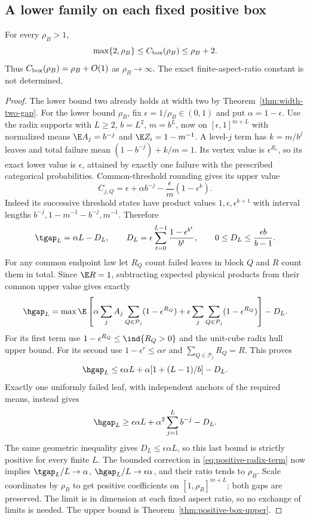 \subsection{A lower family on each fixed positive box}
\begin{theorem}\label{thm:positive-box-lower}
For every $\rho_B>1$,
\[
 \max\{2,\rho_B\}\le C_{\rm box}(\rho_B)\le\rho_B+2.
\]
Thus $C_{\rm box}(\rho_B)=\rho_B+O(1)$ as $\rho_B\to\infty$.
The exact finite-aspect-ratio constant is not determined.
\end{theorem}
\begin{proof}
The lower bound two already holds at width two by
Theorem~\ref{thm:width-two-gap}. For the lower bound $\rho_B$, fix
$\epsilon=1/\rho_B\in(0,1)$ and put $\alpha=1-\epsilon$.
Use the radix supports with $L\ge2$, $b=L^2$, $m=b^L$, now on
$[\epsilon,1]^{m+L}$ with normalized means
$\E A_j=b^{-j}$ and $\E Z_i=1-m^{-1}$. A level-$j$ term has
$k=m/b^j$ leaves and total failure mean $(1-b^{-j})+k/m=1$.
Its vertex value is $\epsilon^{R_e}$, so its exact lower value is
$\epsilon$, attained by exactly one failure with the prescribed
categorical probabilities. Common-threshold rounding gives its upper
value
\[
 C_{j,Q}=\epsilon+\alpha b^{-j}
                      -\frac\epsilon m(1-\epsilon^k).
\]
Indeed its successive threshold states have product values
$1,\epsilon,\epsilon^{k+1}$ with interval lengths
$b^{-j},1-m^{-1}-b^{-j},m^{-1}$. Therefore
\begin{equation}\label{eq:positive-radix-term}
 \tgap_L=\alpha L-D_L,\qquad
 D_L=\epsilon\sum_{t=0}^{L-1}\frac{1-\epsilon^{b^t}}{b^t},
 \qquad0\le D_L\le\frac{\epsilon b}{b-1}.
\end{equation}
For any common endpoint law let $R_Q$ count failed leaves in block $Q$
and $R$ count them in total. Since $\E R=1$, subtracting expected
physical products from their common upper value gives exactly
\begin{equation}\label{eq:softened-coverage}
 \hgap_L=\max\E\left[
 \alpha\sum_jA_j\sum_{Q\in\mathcal P_j}(1-\epsilon^{R_Q})
 +\epsilon\sum_j\sum_{Q\in\mathcal P_j}(1-\epsilon^{R_Q})
 \right]-D_L.
\end{equation}
For its first term use $1-\epsilon^{R_Q}\le\ind\{R_Q>0\}$ and the
unit-cube radix hull upper bound. For its second use
$1-\epsilon^r\le\alpha r$ and $\sum_{Q\in\mathcal P_j}R_Q=R$.
This proves
\[
 \hgap_L\le\epsilon\alpha L+
                 \alpha[1+(L-1)/b]-D_L.
\]
Exactly one uniformly failed leaf, with independent anchors of the
required means, instead gives
\[
 \hgap_L\ge\epsilon\alpha L+
                    \alpha^2\sum_{j=1}^Lb^{-j}-D_L.
\]
The same geometric inequality gives $D_L\le\epsilon\alpha L$, so this
last bound is strictly positive for every finite $L$. The bounded
correction in \eqref{eq:positive-radix-term} now implies
$\tgap_L/L\to\alpha$, $\hgap_L/L\to\epsilon\alpha$, and their ratio
tends to $\rho_B$. Scale coordinates by $\rho_B$ to get positive
coefficients on $[1,\rho_B]^{m+L}$; both gaps are preserved. The limit
is in dimension at each fixed aspect ratio, so no exchange of limits is
needed. The upper bound is Theorem~\ref{thm:positive-box-upper}.
\end{proof}

